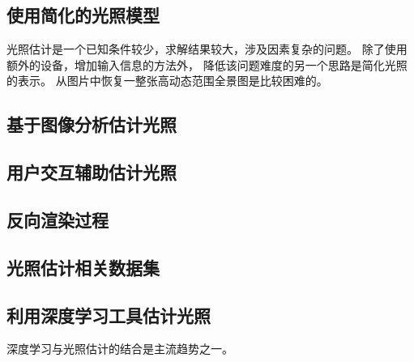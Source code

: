\subsection{使用简化的光照模型}
光照估计是一个已知条件较少，求解结果较大，涉及因素复杂的问题。
除了使用额外的设备，增加输入信息的方法外，
降低该问题难度的另一个思路是简化光照的表示。
从图片中恢复一整张高动态范围全景图是比较困难的。
\subsection{基于图像分析估计光照}
\subsection{用户交互辅助估计光照}
\subsection{反向渲染过程}

\subsection{光照估计相关数据集}
\subsection{利用深度学习工具估计光照}

深度学习与光照估计的结合是主流趋势之一。